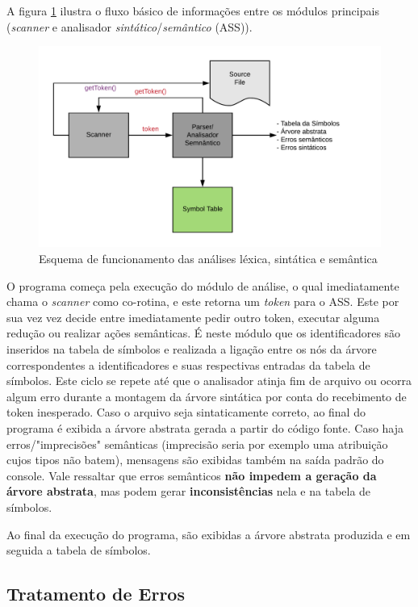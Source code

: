 \documentclass[
	article,			%
	11pt,				%
	oneside,			%
	a4paper,			%
	english,			%
	brazil,				%
	sumario=tradicional
	]{abntex2}
\renewcommand{\it}[1]{\textit{#1}}
\renewcommand{\bf}[1]{\textbf{#1}}
\begin{document}
A figura \ref{esquema} ilustra o fluxo básico de informações entre os módulos principais (\it{scanner} e analisador \it{sintático}/\it{semântico} (ASS)).

\begin{figure}[hbt!]
	\caption{Esquema de funcionamento das análises léxica, sintática e semântica}
	\label{esquema}
	\centering
	\includegraphics[scale=0.8]{img/diagrama-tradutores.png}
\end{figure}

O programa começa pela execução do módulo de análise, o qual imediatamente chama o \it{scanner} como co-rotina, e este retorna um \it{token} para o ASS. Este por sua vez vez decide entre
imediatamente pedir outro token, executar alguma redução ou realizar ações semânticas. É neste módulo que os identificadores são inseridos na tabela
de símbolos e realizada a ligação entre os nós da árvore correspondentes a identificadores e suas respectivas entradas da tabela de símbolos. Este ciclo se repete até que o analisador atinja fim de arquivo
ou ocorra algum erro durante a montagem da árvore sintática por conta do recebimento de
token inesperado. Caso o arquivo seja sintaticamente correto, ao final do programa é exibida a árvore abstrata gerada a partir do código fonte. Caso haja erros/"imprecisões" semânticas (imprecisão seria por exemplo uma atribuição cujos tipos não batem), mensagens são exibidas também na saída padrão do console. Vale ressaltar que erros semânticos \bf{não impedem a geração da árvore abstrata}, mas podem gerar \bf{inconsistências} nela e na tabela de símbolos.

Ao final da execução do programa, são exibidas a árvore abstrata produzida e em seguida a tabela de símbolos.

\subsection{Tratamento de Erros}
\end{document}
